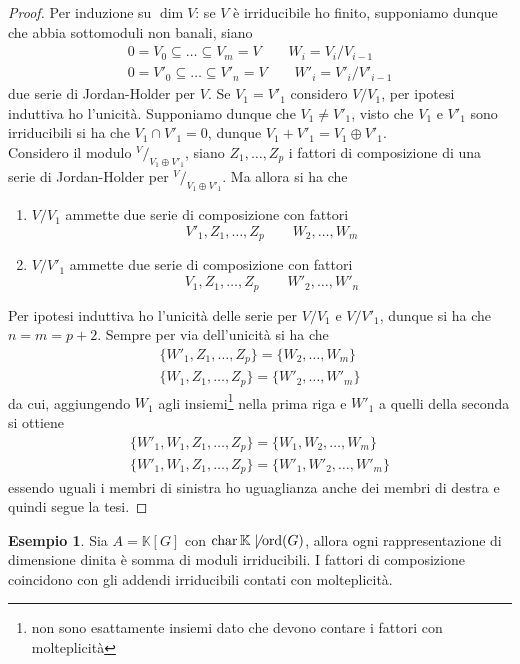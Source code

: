 \documentclass[11pt]{article}
\theoremstyle{plain}
\theoremstyle{definition}
\newtheorem{exmp}{Esempio}[section]
\theoremstyle{remark}
\newcommand{\K}{\mathbb{K}}
\newcommand*\quot[2]{{^{\textstyle #1}\big/_{\textstyle #2}}}
\DeclareMathOperator{\Char}{char}
\DeclareMathOperator{\ord}{ord}
\begin{document}
	\begin{proof}
		Per induzione su $\dim V$: se $V$ è irriducibile ho finito, supponiamo dunque che abbia sottomoduli non banali, siano
		\begin{gather*}
			0=V_0\subseteq\ldots \subseteq V_m = V\qquad W_i=V_i/V_{i-1}\\
			0=V'_0\subseteq\ldots \subseteq V'_n = V\qquad W'_i=V'_i/V'_{i-1}
		\end{gather*}
		due serie di Jordan-Holder per $V$. Se $V_1=V'_1$ considero $V/V_1$, per ipotesi induttiva ho l'unicità. Supponiamo dunque che $V_1\neq V'_1$, visto che $V_1$ e $V'_1$ sono irriducibili si ha che $V_1\cap V'_1=0$, dunque $V_1+V'_1=V_1\oplus V'_1$.\\
		Considero il modulo $\quot{V}{V_1\oplus V'_1}$, siano $Z_1,\ldots,Z_p$ i fattori di composizione di una serie di Jordan-Holder per $\quot{V}{V_1\oplus V'_1}$. Ma allora si ha che
		\begin{enumerate}
			\item $V/V_1$ ammette due serie di composizione con fattori
			\[
				V'_1,Z_1,\ldots,Z_p\qquad W_2,\ldots,W_m
			\]
			\item $V/V'_1$ ammette due serie di composizione con fattori
			\[
				V_1,Z_1,\ldots,Z_p\qquad W'_2,\ldots,W'_n
			\]
		\end{enumerate}
		Per ipotesi induttiva ho l'unicità delle serie per $V/V_1$ e $V/V'_1$, dunque si ha che $n=m=p+2$. Sempre per via dell'unicità si ha che
		\begin{gather*}
			\{ W'_1,Z_1,\ldots,Z_p\} = \{ W_2,\ldots,W_m\}\\
			\{ W_1,Z_1,\ldots,Z_p\} = \{ W'_2,\ldots,W'_m\}
		\end{gather*}
		da cui, aggiungendo $W_1$ agli insiemi\footnote{non sono esattamente insiemi dato che devono contare i fattori con molteplicità} nella prima riga e $W'_1$ a quelli della seconda si ottiene
		\begin{gather*}
			\{ W'_1,W_1,Z_1,\ldots,Z_p\} = \{ W_1,W_2,\ldots,W_m\}\\
			\{ W'_1,W_1,Z_1,\ldots,Z_p\} = \{ W'_1,W'_2,\ldots,W'_m\}
		\end{gather*}
		essendo uguali i membri di sinistra ho uguaglianza anche dei membri di destra e quindi segue la tesi.
	\end{proof}
	\begin{exmp}
		Sia $A=\K[G]$ con $\Char \K \not \mid \ord(G)$, allora ogni rappresentazione di dimensione dinita è somma di moduli irriducibili. I fattori di composizione coincidono con gli addendi irriducibili contati con molteplicità.
	\end{exmp}
\end{document}
